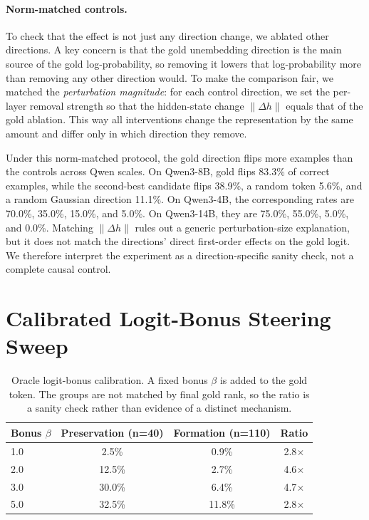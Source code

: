 \documentclass{article} %
\begin{document}
\paragraph{Norm-matched controls.}
To check that the effect is not just any direction change, we ablated other directions. A key concern is that the gold unembedding direction is the main source of the gold log-probability, so removing it lowers that log-probability more than removing any other direction would. To make the comparison fair, we matched the \emph{perturbation magnitude}: for each control direction, we set the per-layer removal strength so that the hidden-state change $\lVert \Delta h \rVert$ equals that of the gold ablation. This way all interventions change the representation by the same amount and differ only in which direction they remove.

Under this norm-matched protocol, the gold direction flips more examples than the controls across Qwen scales. On Qwen3-8B, gold flips 83.3\% of correct examples, while the second-best candidate flips 38.9\%, a random token 5.6\%, and a random Gaussian direction 11.1\%. On Qwen3-4B, the corresponding rates are 70.0\%, 35.0\%, 15.0\%, and 5.0\%. On Qwen3-14B, they are 75.0\%, 55.0\%, 5.0\%, and 0.0\%. Matching $\lVert\Delta h\rVert$ rules out a generic perturbation-size explanation, but it does not match the directions' direct first-order effects on the gold logit. We therefore interpret the experiment as a direction-specific sanity check, not a complete causal control.

\section{Calibrated Logit-Bonus Steering Sweep}
\label{app:steering}

\begin{table}[h]
\centering
\caption{Oracle logit-bonus calibration. A fixed bonus $\beta$ is added to the gold token. The groups are not matched by final gold rank, so the ratio is a sanity check rather than evidence of a distinct mechanism.}
\label{tab:steering}
\begin{tabular}{lccc}
\toprule
\textbf{Bonus $\beta$} & \textbf{Preservation (n=40)} & \textbf{Formation (n=110)} & \textbf{Ratio} \\
\midrule
1.0 & 2.5\% & 0.9\% & 2.8$\times$ \\
2.0 & 12.5\% & 2.7\% & 4.6$\times$ \\
3.0 & 30.0\% & 6.4\% & 4.7$\times$ \\
5.0 & 32.5\% & 11.8\% & 2.8$\times$ \\
\bottomrule
\end{tabular}
\end{table}
\end{document}
